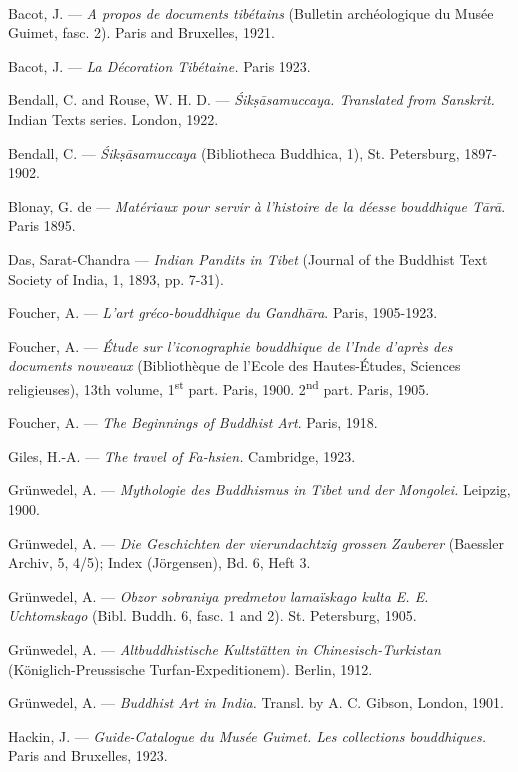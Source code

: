 \documentclass[a4paper, 12pt, oneside]{article}
\begin{document}
\paragraph{}
\small
Bacot, J. --- \emph{A propos de documents tibétains} (Bulletin archéologique du Musée Guimet, fasc. 2). Paris and Bruxelles, 1921.

Bacot, J. --- \emph{La Décoration Tibétaine.} Paris 1923.

Bendall, C. and Rouse, W. H. D. --- \emph{\'{S}ik\d{s}\={a}samuccaya. Translated from Sanskrit.} Indian Texts series. London, 1922.

Bendall, C. --- \emph{\'{S}ik\d{s}\={a}samuccaya} (Bibliotheca Buddhica, 1), St. Petersburg, 1897-1902.

Blonay, G. de --- \emph{Matériaux pour servir à l'histoire de la déesse bouddhique T\={a}r\={a}}. Paris 1895.

Das, Sarat-Chandra --- \emph{Indian Pandits in Tibet} (Journal of the Buddhist Text Society of India, 1, 1893, pp. 7-31).

Foucher, A. --- \emph{L'art gréco-bouddhique du Gandh\={a}ra}. Paris, 1905-1923.

Foucher, A. --- \emph{Étude sur l'iconographie bouddhique de l'Inde d'après des documents nouveaux} (Bibliothèque de l'Ecole des Hautes-Études, Sciences religieuses), 13th volume, 1\textsuperscript{st} part. Paris, 1900. 2\textsuperscript{nd} part. Paris, 1905.

Foucher, A. --- \emph{The Beginnings of Buddhist Art}. Paris, 1918.

Giles, H.-A. --- \emph{The travel of Fa-hsien.} Cambridge, 1923.

Grünwedel, A. --- \emph{Mythologie des Buddhismus in Tibet und der Mongolei.} Leipzig, 1900.

Grünwedel, A. --- \emph{Die Geschichten der vierundachtzig grossen Zauberer} (Baessler Archiv, 5, 4/5); Index (Jörgensen), Bd. 6, Heft 3.

Grünwedel, A. --- \emph{Obzor sobraniya predmetov lamaïskago kulta E. E. Uchtomskago} (Bibl. Buddh. 6, fasc. 1 and 2). St. Petersburg, 1905.

Grünwedel, A. --- \emph{Altbuddhistische Kultstätten in Chinesisch-Turkistan} (Königlich-Preussische Turfan-Expeditionem). Berlin, 1912.

Grünwedel, A. --- \emph{Buddhist Art in India.} Transl. by A. C. Gibson, London, 1901.

Hackin, J. --- \emph{Guide-Catalogue du Musée Guimet. Les collections bouddhiques.} Paris and Bruxelles, 1923.
\end{document}

